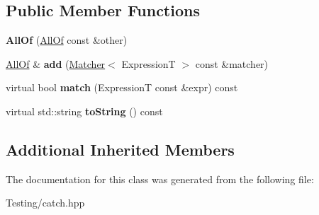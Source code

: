 \subsection*{Public Member Functions}
\begin{DoxyCompactItemize}
\item 
\hypertarget{class_catch_1_1_matchers_1_1_impl_1_1_generic_1_1_all_of_a31f7c5e570e79bdf64064ee87c331a59}{{\bfseries All\-Of} (\hyperlink{class_catch_1_1_matchers_1_1_impl_1_1_generic_1_1_all_of}{All\-Of} const \&other)}\label{class_catch_1_1_matchers_1_1_impl_1_1_generic_1_1_all_of_a31f7c5e570e79bdf64064ee87c331a59}

\item 
\hypertarget{class_catch_1_1_matchers_1_1_impl_1_1_generic_1_1_all_of_a8c5cd1e494ab697076da418ee72ac297}{\hyperlink{class_catch_1_1_matchers_1_1_impl_1_1_generic_1_1_all_of}{All\-Of} \& {\bfseries add} (\hyperlink{struct_catch_1_1_matchers_1_1_impl_1_1_matcher}{Matcher}$<$ Expression\-T $>$ const \&matcher)}\label{class_catch_1_1_matchers_1_1_impl_1_1_generic_1_1_all_of_a8c5cd1e494ab697076da418ee72ac297}

\item 
\hypertarget{class_catch_1_1_matchers_1_1_impl_1_1_generic_1_1_all_of_a04534d0ac9e089f4500c3c19054f11ce}{virtual bool {\bfseries match} (Expression\-T const \&expr) const }\label{class_catch_1_1_matchers_1_1_impl_1_1_generic_1_1_all_of_a04534d0ac9e089f4500c3c19054f11ce}

\item 
\hypertarget{class_catch_1_1_matchers_1_1_impl_1_1_generic_1_1_all_of_a9febc1e67acbeff62a32bcbfdc0c8fab}{virtual std\-::string {\bfseries to\-String} () const }\label{class_catch_1_1_matchers_1_1_impl_1_1_generic_1_1_all_of_a9febc1e67acbeff62a32bcbfdc0c8fab}

\end{DoxyCompactItemize}
\subsection*{Additional Inherited Members}


The documentation for this class was generated from the following file\-:\begin{DoxyCompactItemize}
\item 
Testing/catch.\-hpp\end{DoxyCompactItemize}
